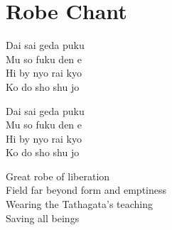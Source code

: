 \documentclass{chant-card}
\begin{document}
\fontsize{12pt}{14pt}\selectfont

\begin{center}
  \sutraOpeningVerse
\end{center}

\begin{center}
  \fourVows
\end{center}

\newpage

\section{Robe Chant}
\def\robechant{%
\begin{center}
Dai sai geda puku\\
Mu so fuku den e\\
Hi by nyo rai kyo\\
Ko do sho shu jo
\end{center}}
\parbox[b]{.5\textwidth}{\robechant}
\parbox[b]{.5\textwidth}{\robechant}
\begin{center}
  Great robe of liberation\\
  Field far beyond form and emptiness\\
  Wearing the Tathagata's teaching\\
  Saving all beings
\end{center}
\end{document}
